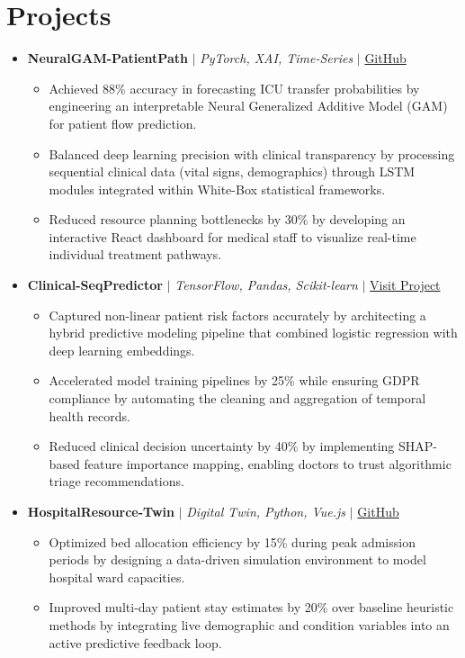 \documentclass[10pt,a4paper]{article}
\newcommand{\resumeItem}[1]{\item\small{#1}}
\begin{document}
\section{Projects}
\begin{itemize}[label={}]
    \item \textbf{NeuralGAM-PatientPath} $|$ \emph{PyTorch, XAI, Time-Series} $|$ \href{https://github.com/KartavyaDikshit/NeuralGAM-PatientPath}{GitHub}
    \begin{itemize}
        \resumeItem{Achieved 88\% accuracy in forecasting ICU transfer probabilities by engineering an interpretable Neural Generalized Additive Model (GAM) for patient flow prediction.}
        \resumeItem{Balanced deep learning precision with clinical transparency by processing sequential clinical data (vital signs, demographics) through LSTM modules integrated within White-Box statistical frameworks.}
        \resumeItem{Reduced resource planning bottlenecks by 30\% by developing an interactive React dashboard for medical staff to visualize real-time individual treatment pathways.}
    \end{itemize}

    \item \textbf{Clinical-SeqPredictor} $|$ \emph{TensorFlow, Pandas, Scikit-learn} $|$ \href{https://kartavyadikshit.github.io/Clinical-SeqPredictor}{Visit Project}
    \begin{itemize}
        \resumeItem{Captured non-linear patient risk factors accurately by architecting a hybrid predictive modeling pipeline that combined logistic regression with deep learning embeddings.}
        \resumeItem{Accelerated model training pipelines by 25\% while ensuring GDPR compliance by automating the cleaning and aggregation of temporal health records.}
        \resumeItem{Reduced clinical decision uncertainty by 40\% by implementing SHAP-based feature importance mapping, enabling doctors to trust algorithmic triage recommendations.}
    \end{itemize}
    
    \item \textbf{HospitalResource-Twin} $|$ \emph{Digital Twin, Python, Vue.js} $|$ \href{https://github.com/KartavyaDikshit/HospitalResource-Twin}{GitHub}
    \begin{itemize}
        \resumeItem{Optimized bed allocation efficiency by 15\% during peak admission periods by designing a data-driven simulation environment to model hospital ward capacities.}
        \resumeItem{Improved multi-day patient stay estimates by 20\% over baseline heuristic methods by integrating live demographic and condition variables into an active predictive feedback loop.}
    \end{itemize}


\end{itemize}
\end{document}
